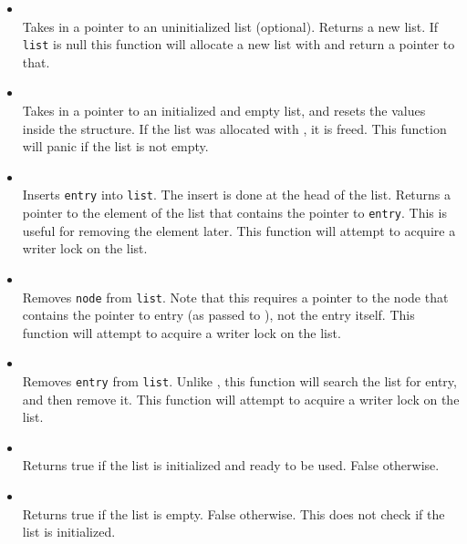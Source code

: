 \begin{itemize}
\item {} \\
Takes in a pointer to an uninitialized list (optional). Returns a new list. 
If \texttt{list} is null this function will allocate a new list with 
 and return a pointer to that.

\item {} \\
Takes in a pointer to an initialized and empty list, and resets the values
inside the structure. If the list was allocated with , it is freed.
This function will panic if the list is not empty. 
\item {} \\
Inserts \texttt{entry} into \texttt{list}. The insert is done at the head of the list. 
Returns a pointer to the element of the list that contains the pointer to \texttt{entry}.
This is useful for removing the element later. This function will attempt to acquire a writer lock
on the list.

\item {} \\
Removes \texttt{node} from \texttt{list}. Note that this requires a pointer to the node that contains
the pointer to entry (as passed to ), not the entry itself. This function will attempt to acquire 
a writer lock on the list.

\item {} \\
Removes \texttt{entry} from \texttt{list}. Unlike , this function will search the
list for entry, and then remove it. This function will attempt to acquire a writer lock on the list.

\item {} \\
Returns true if the list is initialized and ready to be used. False otherwise.

\item {} \\
Returns true if the list is empty. False otherwise. This does not check if the list is initialized.


\end{itemize}
